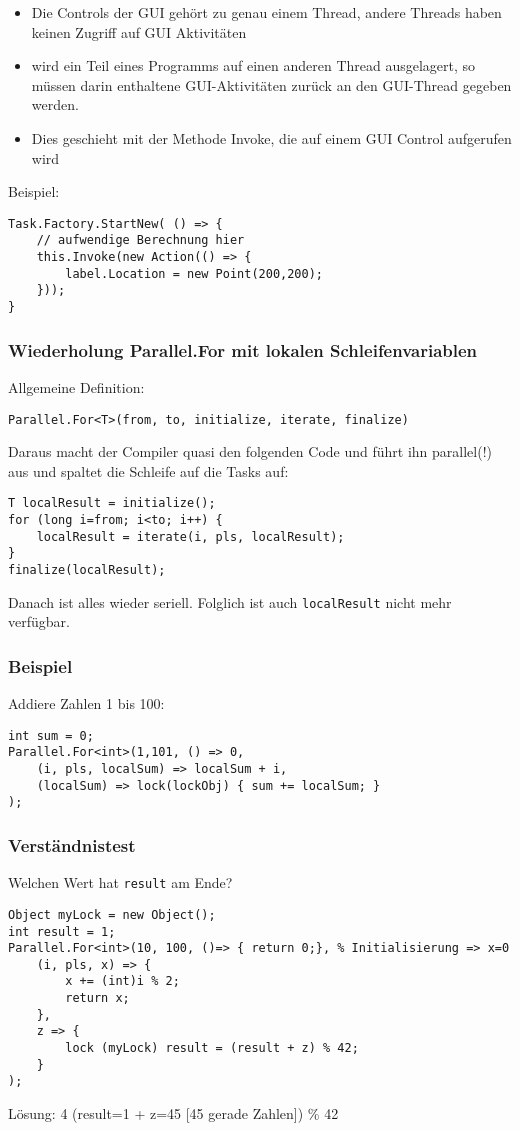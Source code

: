 \begin{itemize}
\item Die Controls der GUI gehört zu genau einem Thread, andere Threads haben keinen Zugriff auf GUI Aktivitäten
\item wird ein Teil eines Programms auf einen anderen Thread ausgelagert, so müssen darin enthaltene GUI-Aktivitäten zurück an den GUI-Thread gegeben werden. 
\item Dies geschieht mit der Methode Invoke, die auf einem GUI Control aufgerufen wird
\end{itemize}
Beispiel:
\begin{lstlisting}[language={[Sharp]C}]
Task.Factory.StartNew( () => {
	// aufwendige Berechnung hier
	this.Invoke(new Action(() => {
		label.Location = new Point(200,200);
	}));
}
\end{lstlisting}

\subsubsection{Wiederholung Parallel.For mit lokalen Schleifenvariablen}
Allgemeine Definition:
\begin{lstlisting}[language={[Sharp]C}]
Parallel.For<T>(from, to, initialize, iterate, finalize)
\end{lstlisting}
Daraus macht der Compiler quasi den folgenden Code und führt ihn parallel(!) aus und spaltet die Schleife auf die Tasks auf:
\begin{lstlisting}[language={[Sharp]C}]
T localResult = initialize();
for (long i=from; i<to; i++) {
	localResult = iterate(i, pls, localResult);
}
finalize(localResult);
\end{lstlisting}

Danach ist alles wieder seriell. Folglich ist auch \lstinline`localResult` nicht mehr verfügbar.

\subsubsection*{Beispiel}
Addiere Zahlen 1 bis 100:
\begin{lstlisting}[language={[Sharp]C}]
int sum = 0;
Parallel.For<int>(1,101, () => 0,
	(i, pls, localSum) => localSum + i, 
	(localSum) => lock(lockObj) { sum += localSum; }
);
\end{lstlisting}

\subsubsection*{Verständnistest}
Welchen Wert hat \lstinline`result` am Ende?
\begin{lstlisting}[language={[Sharp]C}]
Object myLock = new Object();
int result = 1;
Parallel.For<int>(10, 100, ()=> { return 0;}, % Initialisierung => x=0
	(i, pls, x) => {
		x += (int)i % 2;
		return x;
	},
	z => {
		lock (myLock) result = (result + z) % 42;
	}
);
\end{lstlisting}

Lösung: 4 (result=1 + z=45 [45 gerade Zahlen]) \% 42


